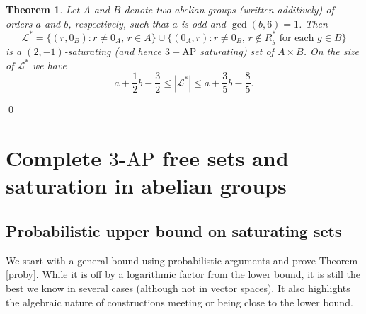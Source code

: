 \documentclass[11pt]{article}
\numberwithin{table}{section}
\newcommand{\cL}{{\mathcal L}}
\newcommand{\F}{{\mathbb F}}
\newtheorem{theorem}{Theorem}[section]
\newtheorem{corollary}[theorem]{Corollary}
\theoremstyle{definition}
\begin{document}
	\begin{theorem}
		\label{dirprod2}
		Let $A$ and $B$ denote two abelian groups (written additively) of orders $a$ and $b$, respectively, such that $a$ is odd and $\gcd(b,6)=1$. 
		Then
		\[\cL^*=\{(r,0_B) : r \neq 0_A,\, r\in A\} \cup \{(0_A,r) : r \neq 0_B,\, r\notin R^*_g \mbox{ for each } g \in B\}\]
		is a $(2,-1)$-saturating (and hence $3-\mathrm{AP}$ saturating) set of $A\times B$.
		On the size of $\cL^*$ we have
		\[a+\frac 12 b- \frac32 \leq |\cL^*|\leq a+\frac35 b - \frac85.\]\end{theorem}
	\qed
	
	
	
	
	
	
	
	\section{\texorpdfstring{Complete $3$-$\mathrm{AP}$ free sets and saturation in abelian groups}{Complete 3-AP free sets and saturation in abelian groups}}
	
	
	
	\subsection{Probabilistic upper bound on saturating sets}
	
	
	We start with a general bound using probabilistic arguments and prove Theorem \ref{proby}. While it is off by a logarithmic factor from the lower bound, it is still the best we know in several cases (although not in vector spaces). It also highlights the algebraic nature of constructions meeting or being close to the lower bound.
	
\end{document}
